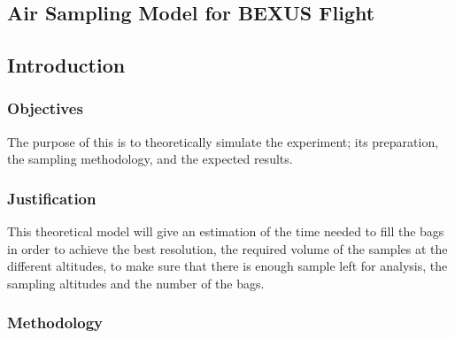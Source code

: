 \documentclass[a4paper,12pt,twoside]{article}
\begin{document}
\begin{appendices}



\section{Air Sampling Model for BEXUS Flight}\label{sec:appH}


\subsection{Introduction}


\subsubsection{Objectives}

The purpose of this is to theoretically simulate the experiment; its preparation, the sampling methodology, and the expected results.

\subsubsection{Justification}

This theoretical model will give an estimation of the time needed to fill the bags in order to achieve the best resolution, the required volume of the samples at the different altitudes, to make sure that there is enough sample left for analysis, the sampling altitudes and the number of the bags.  

\subsubsection{Methodology}


\end{appendices}
\end{document}

